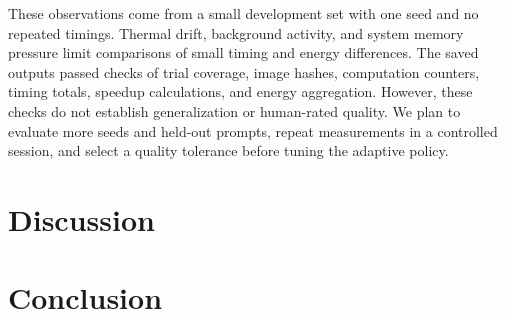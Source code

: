 \documentclass[12pt,letterpaper]{article}
\begin{document}
These observations come from a small development set with one seed and no repeated timings. Thermal drift, background activity, and system memory pressure limit comparisons of small timing and energy differences. The saved outputs passed checks of trial coverage, image hashes, computation counters, timing totals, speedup calculations, and energy aggregation. However, these checks do not establish generalization or human-rated quality. We plan to evaluate more seeds and held-out prompts, repeat measurements in a controlled session, and select a quality tolerance before tuning the adaptive policy.

\section{Discussion}

\section{Conclusion}

\makereference



\end{document}
